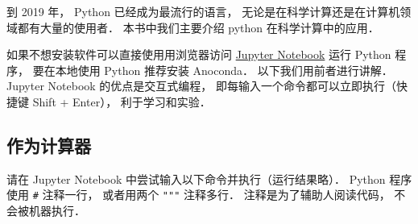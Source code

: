 
到 2019 年， Python 已经成为最流行的语言， 无论是在科学计算还是在计算机领域都有大量的使用者． 本书中我们主要介绍 python 在科学计算中的应用．

如果不想安装软件可以直接使用用浏览器访问 \href{https://jupyter.org/}{Jupyter Notebook} 运行 Python 程序， 要在本地使用 Python 推荐安装 Anoconda． 以下我们用前者进行讲解． Jupyter Notebook 的优点是交互式编程， 即每输入一个命令都可以立即执行（快捷键 Shift + Enter）， 利于学习和实验．

\subsection{作为计算器}
请在 Jupyter Notebook 中尝试输入以下命令并执行（运行结果略）． Python 程序使用 \verb|#| 注释一行，  或者用两个 \verb|"""| 注释多行． 注释是为了辅助人阅读代码， 不会被机器执行．

